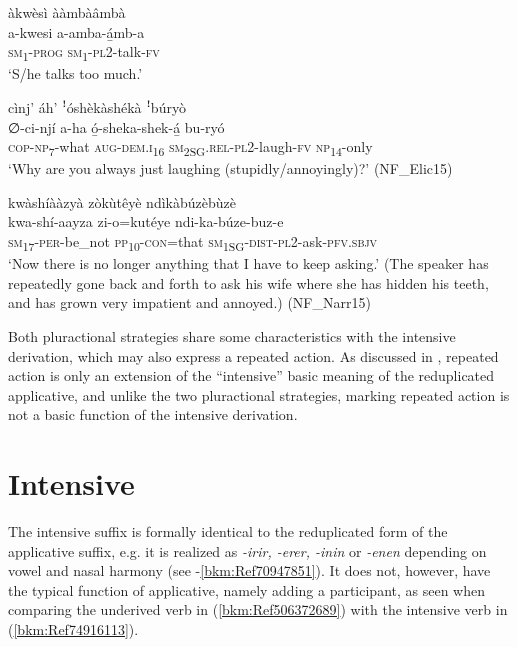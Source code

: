 \ea
àkwèsì ààmbàâmbà\\
\gll a-kwesi  a-amba-á̲mb-a\\
\textsc{sm}\textsubscript{1}-\textsc{prog}  \textsc{sm}\textsubscript{1}-\textsc{pl}2-talk-\textsc{fv}\\
\glt ‘S/he talks too much.’
\z

\ea
cìnj’ áh’ ꜝóshèkàshékà ꜝbúryò\\
\gll ∅-ci-njí    a-ha    ó̲-sheka-shek-á̲    bu-ryó\\
\textsc{cop}-\textsc{np}\textsubscript{7}-what  \textsc{aug}-\textsc{dem}.\textsc{i}\textsubscript{16}  \textsc{sm}\textsubscript{2SG}.\textsc{rel}-\textsc{pl}2-laugh-\textsc{fv}  \textsc{np}\textsubscript{14}-only\\
\glt ‘Why are you always just laughing (stupidly/annoyingly)?’ (NF\_Elic15)
\z

\ea
\label{bkm:Ref99092418}
kwàshíààzyà zòkùtêyè ndìkàbúzèbùzè\\
\gll kwa-shí-aayza  zi-o=kutéye    ndi-ka-búze-buz-e\\
\textsc{sm}\textsubscript{17}-\textsc{per}-be\_not  \textsc{pp}\textsubscript{10}-\textsc{con}=that  \textsc{sm}\textsubscript{1SG}-\textsc{dist}-\textsc{pl}2-ask-\textsc{pfv}.\textsc{sbjv}\\
\glt ‘Now there is no longer anything that I have to keep asking.’ (The speaker has repeatedly gone back and forth to ask his wife where she has hidden his teeth, and has grown very impatient and annoyed.) (NF\_Narr15)
\z

\begin{sloppypar}
Both pluractional strategies share some characteristics with the intensive derivation, which may also express a repeated action. As discussed in , repeated action is only an extension of the “intensive” basic meaning of the reduplicated applicative, and unlike the two pluractional strategies, marking repeated action is not a basic function of the intensive derivation.
\end{sloppypar}

\section{Intensive}
\label{bkm:Ref485997587}\label{bkm:Ref492040534}\hypertarget{Toc75352667}{}
The intensive suffix is formally identical to the reduplicated form of the applicative suffix, e.g. it is realized as \textit{\nobreakdash-irir, \nobreakdash-erer, \nobreakdash-inin} or \textit{\-\nobreakdash-enen} depending on vowel and nasal harmony (see -\ref{bkm:Ref70947851}). It does not, however, have the typical function of applicative, namely adding a participant, as seen when comparing the underived verb in (\ref{bkm:Ref506372689}) with the intensive verb in (\ref{bkm:Ref74916113}).

